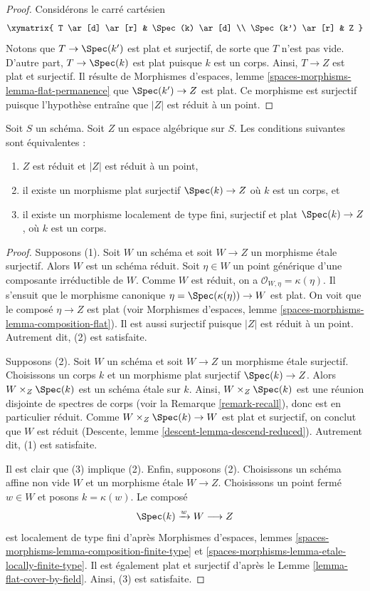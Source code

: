 \begin{proof}
Considérons le carré cartésien
$$
\xymatrix{
T \ar[d] \ar[r] & \Spec(k) \ar[d] \\
\Spec(k') \ar[r] & Z
}
$$
Notons que $T \to \Spec(k')$ est plat et surjectif, de sorte que $T$
n'est pas vide. D'autre part, $T \to \Spec(k)$ est plat puisque
$k$ est un corps. Ainsi, $T \to Z$ est plat et surjectif.
Il résulte de
Morphismes d'espaces, lemme \ref{spaces-morphisms-lemma-flat-permanence}
que $\Spec(k') \to Z$ est plat. Ce morphisme est surjectif puisque
l'hypothèse entraîne que $|Z|$ est réduit à un point.
\end{proof}

\begin{lemma}
\label{lemma-unique-point}
Soit $S$ un schéma.
Soit $Z$ un espace algébrique sur $S$. Les conditions suivantes sont
équivalentes :
\begin{enumerate}
\item $Z$ est réduit et $|Z|$ est réduit à un point,
\item il existe un morphisme plat surjectif $\Spec(k) \to Z$
où $k$ est un corps, et
\item il existe un morphisme localement de type fini, surjectif et plat
$\Spec(k) \to Z$, où $k$ est un corps.
\end{enumerate}
\end{lemma}

\begin{proof}
Supposons (1). Soit $W$ un schéma et
soit $W \to Z$ un morphisme \'etale surjectif. Alors $W$ est
un schéma réduit. Soit $\eta \in W$ un point générique d'une composante
irréductible de $W$. Comme $W$ est réduit, on a
$\mathcal{O}_{W, \eta} = \kappa(\eta)$. Il s'ensuit que le morphisme canonique
$\eta = \Spec(\kappa(\eta)) \to W$ est plat. On voit que le composé
$\eta \to Z$ est plat (voir
Morphismes d'espaces, lemme \ref{spaces-morphisms-lemma-composition-flat}).
Il est aussi surjectif puisque $|Z|$ est réduit à un point. Autrement dit,
(2) est satisfaite.

\medskip\noindent
Supposons (2). Soit $W$ un schéma et
soit $W \to Z$ un morphisme \'etale surjectif. Choisissons un corps
$k$ et un morphisme plat surjectif $\Spec(k) \to Z$.
Alors $W \times_Z \Spec(k)$ est un schéma \'etale sur $k$.
Ainsi, $W \times_Z \Spec(k)$ est une réunion disjointe de spectres de corps
(voir la Remarque \ref{remark-recall}), donc est en particulier réduit. Comme
$W \times_Z \Spec(k) \to W$
est plat et surjectif, on conclut que $W$ est réduit
(Descente, lemme \ref{descent-lemma-descend-reduced}).
Autrement dit, (1) est satisfaite.

\medskip\noindent
Il est clair que (3) implique (2). Enfin, supposons (2). Choisissons un schéma
affine non vide $W$ et un morphisme \'etale $W \to Z$. Choisissons un point
fermé $w \in W$ et posons $k = \kappa(w)$. Le composé
$$
\Spec(k) \xrightarrow{w} W \longrightarrow Z
$$
est localement de type fini d'après
Morphismes d'espaces, lemmes
\ref{spaces-morphisms-lemma-composition-finite-type} et
\ref{spaces-morphisms-lemma-etale-locally-finite-type}.
Il est également plat et surjectif d'après le
Lemme \ref{lemma-flat-cover-by-field}.
Ainsi, (3) est satisfaite.
\end{proof}

